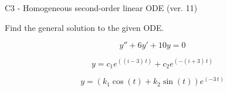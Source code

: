 \begin{exercise}
  \begin{exerciseTitle}C3 - Homogeneous second-order linear ODE (ver. 11)\end{exerciseTitle}
  \begin{exerciseStatement}
    
Find the general solution to the given ODE.

    
\[y''+6y'+10y = 0\]

  \end{exerciseStatement}
  \begin{exerciseAnswer}
    
\[y= c_{1} e^{\left(\left(i - 3\right) \, t\right)} + c_{2} e^{\left(-\left(i + 3\right) \, t\right)}\]

    
\[y= {\left(k_{1} \cos\left(t\right) + k_{2} \sin\left(t\right)\right)} e^{\left(-3 \, t\right)}\]

  \end{exerciseAnswer}
\end{exercise}